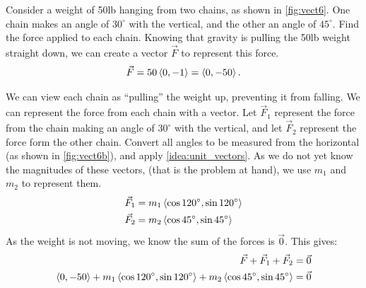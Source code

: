 \begin{example}\label{ex_vect6}%
Consider a weight of 50lb hanging from two chains, as shown in \autoref{fig:vect6}. One chain makes an angle of $30^\circ$ with the vertical, and the other an angle of $45^\circ$. Find the force applied to each chain.
\solution
Knowing that gravity is pulling the 50lb weight straight down, we can create a vector $\vec F$ to represent this force. 
\[\vec F = 50\left\langle 0,-1\right\rangle=\left\langle 0,-50\right\rangle.\]

We can view each chain as ``pulling'' the weight up, preventing it from falling. We can represent the force from each chain with a vector. Let $\vec F_1$ represent the force from the chain making an angle of $30^\circ$ with the vertical, and let $\vec F_2$ represent the force form the other chain. Convert all angles to be measured from the horizontal (as shown in \autoref{fig:vect6b}), and apply \autoref{idea:unit_vectors}. As we do not yet know the magnitudes of these vectors, (that is the problem at hand), we use $m_1$ and $m_2$ to represent them.
\begin{align*}
\vec F_1 &= m_1\left\langle \cos 120^\circ,\sin120^\circ\right\rangle \\
\vec F_2 &= m_2\left\langle \cos 45^\circ,\sin45^\circ\right\rangle
\end{align*}
As the weight is not moving, we know the sum of the forces is $\vec 0$. This gives:
\begin{align*}
\vec F + \vec F_1 + \vec F_2 & = \vec 0\\
\left\langle 0,-50\right\rangle+ m_1\left\langle \cos 120^\circ,\sin120^\circ\right\rangle+ m_2\left\langle \cos 45^\circ,\sin45^\circ\right\rangle&=\vec 0
\end{align*}



\end{example}
